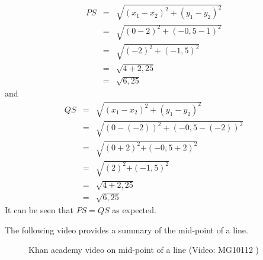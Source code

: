 \begin{eqnarray*}
PS & = & \sqrt{{({x}_{1} - {x}_{2})}^{2} + {({y}_{1} - {y}_{2})}^{2}} \\ 
& = & \sqrt{{(0 - 2)}^{2} + {(-0,5 - 1)}^{2}} \\ 
& = & \sqrt{{(-2)}^{2} + {(-1,5)}^{2}} \\ 
& = & \sqrt{4 + 2,25} \\ 
& = & \sqrt{6,25}
\end{eqnarray*}
and
\begin{eqnarray*}
QS & = & \sqrt{{({x}_{1} - {x}_{2})}^{2} + {({y}_{1} - {y}_{2})}^{2}} \\ 
& = & \sqrt{{(0 - (-2))}^{2} + {(-0,5 - (-2))}^{2}} \\ 
& = & \sqrt{{(0 + 2)}^{2}{+(-0,5 + 2)}^{2}} \\ 
& = & \sqrt{{(2)}^{2}{+(-1,5)}^{2}} \\ 
& = & \sqrt{4 + 2,25} \\ 
& = & \sqrt{6,25}
\end{eqnarray*}
It can be seen that $PS=QS$ as expected.\par 
\setcounter{subfigure}{0}
\begin{figure}[H] %
\begin{center}
\end{center}
\end{figure} 
The following video provides a summary of the mid-point of a line.
\setcounter{subfigure}{0}
\begin{figure}[H] %
\textnormal{Khan academy video on mid-point of a line}\vspace{.1in} \nopagebreak
\label{m39119*yt-media2}\label{m39119*yt-video2}
 { (Video:  MG10112 )}
\vspace{2pt}
\vspace{.1in}
\end{figure}      
